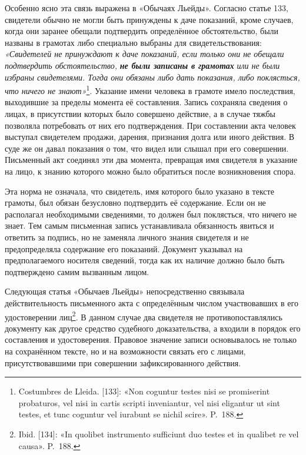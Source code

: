 Особенно ясно эта связь выражена в «Обычаях Льейды». Согласно статье 133, свидетели обычно не могли быть принуждены к даче показаний, кроме случаев, когда они заранее обещали подтвердить определённое обстоятельство, были названы в грамотах либо специально выбраны для свидетельствования: \emph{«Свидетелей не принуждают к даче показаний, если только они не обещали подтвердить обстоятельство, }\textbf{\emph{не были записаны в грамотах}}\emph{ или не были избраны свидетелями}\emph{. Т}\emph{огда они обязаны либо }\emph{дать показания, либо поклясться, что ничего не знают»}\footnote{Costumbres de Lleida. [133]: «Non coguntur testes nisi se promiserint probaturos, vel nisi in cartis scripti inveniantur, vel nisi eligantur ut sint testes, et tunc coguntur vel iurabunt se nichil scire». P.~188.}. Указание имени человека в грамоте имело последствия, выходившие за пределы момента её составления. Запись сохраняла сведения о лицах, в присутствии которых было совершено действие, а в случае тяжбы позволяла потребовать от них его подтверждения. При составлении акта человек выступал свидетелем продажи, дарения, признания долга или иного действия. В суде же он давал показания о том, что видел или слышал при его совершении. Письменный акт соединял эти два момента, превращая имя свидетеля в указание на лицо, к знанию которого можно было обратиться после возникновения спора.

Эта норма не означала, что свидетель, имя которого было указано в тексте грамоты, был обязан безусловно подтвердить её содержание. Если он не располагал необходимыми сведениями, то должен был поклясться, что ничего не знает. Тем самым письменная запись устанавливала обязанность явиться и ответить за подпись, но не заменяла личного знания свидетеля и не предопределяла содержание его показаний. Документ указывал на предполагаемого носителя сведений, тогда как их наличие должно было быть подтверждено самим вызванным лицом.

Следующая статья «Обычаев Льейды» непосредственно связывала действительность письменного акта с определённым числом участвовавших в его удостоверении лиц\footnote{Ibid. [134]: «In quolibet instrumento sufficiunt duo testes et in qualibet re vel causa». P.~188.}. В данном случае два свидетеля не противопоставлялись документу как другое средство судебного доказательства, а входили в порядок его составления и удостоверения. Правовое значение записи основывалось не только на сохранённом тексте, но и на возможности связать его с лицами, присутствовавшими при совершении зафиксированного действия.

